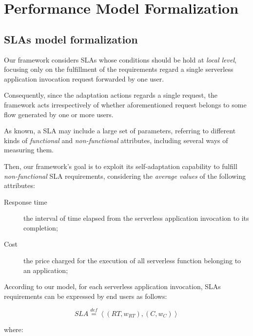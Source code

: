 \documentclass[12pt,a4paper]{report}
\newcommand{\mathDef}{\overset{\textit{def}}{=}}
\theoremstyle{definition}
\begin{document}
\newpage

\chapter{Performance Model Formalization}

\section{SLAs model formalization}

Our framework considers SLAs whose conditions should be hold at \textit{local level}, focusing only on the fulfillment of the requirements regard a single serverless application invocation request forwarded by one user.

Consequently, since the adaptation actions regards a single request, the framework acts irrespectively of whether aforementioned request belongs to some flow generated by one or more users.

As known, a SLA may include a large set of parameters, referring to different kinds of \textit{functional} and \textit{non-functional} attributes, including several ways of measuring them.

Then, our framework's goal is to exploit its self-adaptation capability to fulfill \textit{non-functional} SLA requirements, considering the \textit{average values} of the following attributes:

\begin{description}
	\item[Response time] the interval of time elapsed from the
	serverless application invocation to its completion;
	\item[Cost] the price charged for the execution of all serverless function belonging to an application;
\end{description}

According to our model, for each serverless application invocation, SLAs requirements can be expressed by end users as follows:

\begin{equation}
	SLA \mathDef \left\langle (RT,w_{RT}),(C,w_{C}) \right\rangle 
\end{equation}
   
where:
\end{document}
